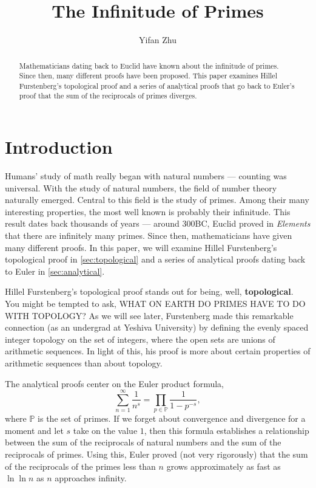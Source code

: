 \documentclass[a4paper]{article}
\theoremstyle{definition}
\theoremstyle{remark}
\begin{document}
\title{The Infinitude of Primes}
\author{
Yifan Zhu
}
\maketitle

\begin{abstract}
  Mathematicians dating back to Euclid have known about the infinitude of primes. Since then, many different proofs have been proposed. This paper examines Hillel Furstenberg's topological proof and a series of analytical proofs that go back to Euler's proof that the sum of the reciprocals of primes diverges.
\end{abstract}

\section{Introduction}
Humans' study of math really began with natural numbers --- counting was universal. With the study of natural numbers, the field of number theory naturally emerged. Central to this field is the study of primes. Among their many interesting properties, the most well known is probably their infinitude. This result dates back thousands of years --- around 300BC, Euclid proved in \textit{Elements} that there are infinitely many primes. \cite{bib:mathHistory} Since then, mathematicians have given many different proofs. In this paper, we will examine Hillel Furstenberg's topological proof in \cref{sec:topological} and a series of analytical proofs dating back to Euler in \cref{sec:analytical}.

Hillel Furstenberg's topological proof stands out for being, well, \textbf{topological}. You might be tempted to ask, {WHAT ON EARTH DO PRIMES HAVE TO DO WITH TOPOLOGY?} As we will see later, Furstenberg made this remarkable connection (as an undergrad at Yeshiva University) by defining the evenly spaced integer topology on the set of integers, where the open sets are unions of arithmetic sequences. In light of this, his proof is more about certain properties of arithmetic sequences than about topology. \cite{bib:Furstenberg} \cite{bib:proofsFromTheBook} 

The analytical proofs center on the Euler product formula,
\[
\sum^\infty_{n=1}\frac{1}{n^s}=\prod_{p\in\mathbb{P}}\frac{1}{1-p^{-s}}
,
\]
where $\mathbb{P}$ is the set of primes.
If we forget about convergence and divergence for a moment and let $s$ take on the value $1$, then this formula establishes a relationship between the sum of the reciprocals of natural numbers and the sum of the reciprocals of primes. Using this, Euler proved (not very rigorously) that the sum of the reciprocals of the primes less than $n$ grows approximately as fast as $\ln\ln n$ as $n$ approaches infinity.
\end{document}

